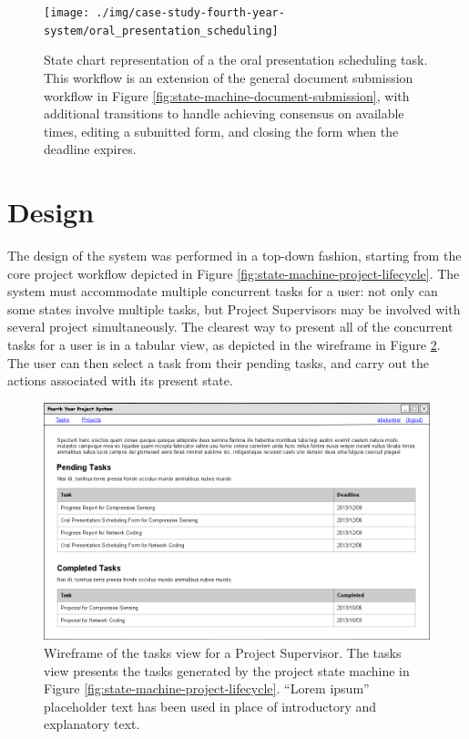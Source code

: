 \documentclass[document.tex]{subfiles}
\begin{document}
\begin{figure}[!htbp]
\centering \texttt{[image: ./img/case-study-fourth-year-system/oral\_presentation\_scheduling]}
\caption{State chart representation of a the oral presentation scheduling task. This workflow is an extension of the general document submission workflow in Figure \ref{fig:state-machine-document-submission}, with additional transitions to handle achieving consensus on available times, editing a submitted form, and closing the form when the deadline expires.}
\label{fig:state-machine-oral-presentation-scheduling}
\end{figure}


\FloatBarrier

\section{Design}
\label{sec:4ys-design}

The design of the system was performed in a top-down fashion, starting from the core project workflow depicted in Figure \ref{fig:state-machine-project-lifecycle}. The system must accommodate multiple concurrent tasks for a user: not only can some states involve multiple tasks, but Project Supervisors may be involved with several project simultaneously. The clearest way to present all of the concurrent tasks for a user is in a tabular view, as depicted in the wireframe in Figure \ref{fig:wireframe-tasks-view}. The user can then select a task from their pending tasks, and carry out the actions associated with its present state.

\begin{figure}[!htbp]
\centering \includegraphics[width=6in]{./img/case-study-fourth-year-system/supervisor-tasks-view_wireframe}
\caption{Wireframe of the tasks view for a Project Supervisor. The tasks view presents the tasks generated by the project state machine in Figure \ref{fig:state-machine-project-lifecycle}. ``Lorem ipsum'' placeholder text has been used in place of introductory and explanatory text.}
\label{fig:wireframe-tasks-view}
\end{figure}
\end{document}
